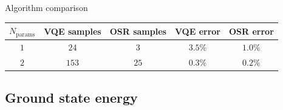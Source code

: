 \documentclass[9pt, handout, aspectratio=169]{beamer}	%
\begin{document}
\begin{frame}{Algorithm comparison}
\vspace{-1em}

\begin{table}[!bp]
	\centering
	\begin{tabular}{ c c c c c }
		\hline
		$N_\text{params}$ & VQE samples & OSR samples &
		VQE error & OSR error \\
		\hline
		\hline
		$1$ & $24$ & $3$ & $3.5\%$ & $1.0\%$ \\
		\hline
		$2$ & $153$ & $25$ & $0.3\%$ & $0.2\%$ \\
		\hline
	\end{tabular}
\end{table}

\end{frame}


\subsection{Ground state energy}
\end{document}
